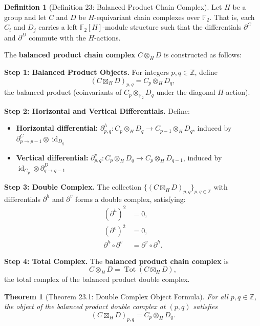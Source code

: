 \documentclass[11pt]{article}
\theoremstyle{plain}
\newtheorem*{theorem}{Theorem}
\theoremstyle{definition}
\newtheorem*{definition}{Definition}
\theoremstyle{remark}
\begin{document}
\begin{definition}[Definition 23: Balanced Product Chain Complex]
Let $H$ be a group and let $C$ and $D$ be $H$-equivariant chain complexes over $\mathbb{F}_2$. That is, each $C_i$ and $D_j$ carries a left $\mathbb{F}_2[H]$-module structure such that the differentials $\partial^C$ and $\partial^D$ commute with the $H$-actions.

The \textbf{balanced product chain complex} $C \otimes_H D$ is constructed as follows:

\textbf{Step 1: Balanced Product Objects.} For integers $p, q \in \mathbb{Z}$, define
\[
(C \boxtimes_H D)_{p,q} = C_p \otimes_H D_q,
\]
the balanced product (coinvariants of $C_p \otimes_{\mathbb{F}_2} D_q$ under the diagonal $H$-action).

\textbf{Step 2: Horizontal and Vertical Differentials.} Define:
\begin{itemize}
\item \textbf{Horizontal differential:} $\partial^h_{p,q} : C_p \otimes_H D_q \to C_{p-1} \otimes_H D_q$, induced by $\partial^C_{p \to p-1} \otimes \operatorname{id}_{D_q}$
\item \textbf{Vertical differential:} $\partial^v_{p,q} : C_p \otimes_H D_q \to C_p \otimes_H D_{q-1}$, induced by $\operatorname{id}_{C_p} \otimes \partial^D_{q \to q-1}$
\end{itemize}

\textbf{Step 3: Double Complex.} The collection $\{(C \boxtimes_H D)_{p,q}\}_{p,q \in \mathbb{Z}}$ with differentials $\partial^h$ and $\partial^v$ forms a double complex, satisfying:
\begin{align}
(\partial^h)^2 &= 0, \\
(\partial^v)^2 &= 0, \\
\partial^h \circ \partial^v &= \partial^v \circ \partial^h.
\end{align}

\textbf{Step 4: Total Complex.} The \textbf{balanced product chain complex} is
\[
C \otimes_H D = \operatorname{Tot}(C \boxtimes_H D),
\]
the total complex of the balanced product double complex.
\end{definition}

\begin{theorem}[Theorem 23.1: Double Complex Object Formula]
For all $p, q \in \mathbb{Z}$, the object of the balanced product double complex at $(p,q)$ satisfies
\[
(C \boxtimes_H D)_{p,q} = C_p \otimes_H D_q.
\]
\end{theorem}
\end{document}
